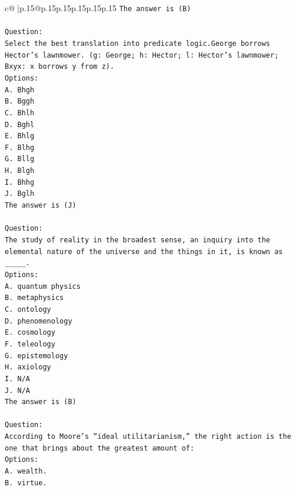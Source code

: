 \documentclass{article}
\begin{document}
{\begin{supertabular}{c@{$\;$}|p{.15\linewidth}@{}p{.15\linewidth}p{.15\linewidth}p{.15\linewidth}p{.15\linewidth}p{.15\linewidth}}
{{{\texttt{The answer is (B)} \\
\\ 
\texttt{Question:} \\
\texttt{Select the best translation into predicate logic.George borrows Hector's lawnmower. (g: George; h: Hector; l: Hector's lawnmower; Bxyx: x borrows y from z).} \\
\texttt{Options:} \\
\texttt{A. Bhgh} \\
\texttt{B. Bggh} \\
\texttt{C. Bhlh} \\
\texttt{D. Bghl} \\
\texttt{E. Bhlg} \\
\texttt{F. Blhg} \\
\texttt{G. Bllg} \\
\texttt{H. Blgh} \\
\texttt{I. Bhhg} \\
\texttt{J. Bglh} \\
\texttt{The answer is (J)} \\
\\ 
\texttt{Question:} \\
\texttt{The study of reality in the broadest sense, an inquiry into the elemental nature of the universe and the things in it, is known as \_\_\_\_\_.} \\
\texttt{Options:} \\
\texttt{A. quantum physics} \\
\texttt{B. metaphysics} \\
\texttt{C. ontology} \\
\texttt{D. phenomenology} \\
\texttt{E. cosmology} \\
\texttt{F. teleology} \\
\texttt{G. epistemology} \\
\texttt{H. axiology} \\
\texttt{I. N/A} \\
\texttt{J. N/A} \\
\texttt{The answer is (B)} \\
\\ 
\texttt{Question:} \\
\texttt{According to Moore’s “ideal utilitarianism,” the right action is the one that brings about the greatest amount of:} \\
\texttt{Options:} \\
\texttt{A. wealth.} \\
\texttt{B. virtue.} \\
}}}
\end{supertabular}}
\end{document}
